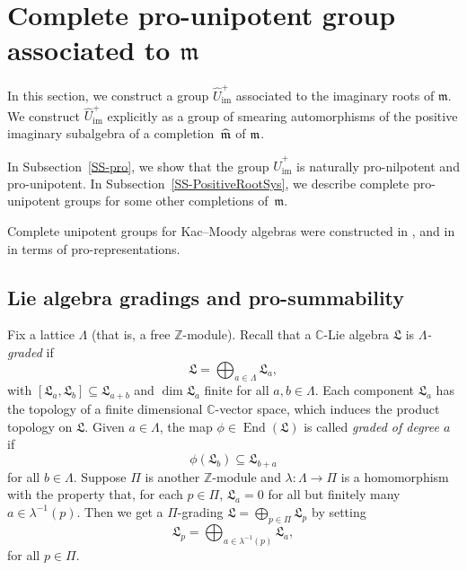 \documentclass[11pt,letterpaper]{amsart}
\numberwithin{thecounter}{section}
\theoremstyle{definition}
\DeclareMathOperator{\Aut}{Aut}
\DeclareMathOperator{\End}{End}
\DeclareMathOperator{\im}{{im}}
\newcommand{\Z}{{\mathbb Z}}
\newcommand{\C}{{\mathbb C}}
\newcommand{\Uhimp}{{\widehat{U}_{\im}^+}}
\begin{document}
\section{Complete pro-unipotent group associated to $\mathfrak m$}\label{S-unip}




In this section, we construct a group $\Uhimp$ associated to the imaginary roots of $\mathfrak m$. We construct  $\Uhimp$ explicitly  as a group of smearing  automorphisms of the positive imaginary subalgebra of a completion~$\widehat{\frak m}$ of $\frak m$. 

In Subsection~\ref{SS-pro}, we show that the group $\Uhimp$ is naturally pro-nilpotent and pro-unipotent.
In Subsection~\ref{SS-PositiveRootSys}, we describe complete pro-unipotent groups for some other completions of~$\mathfrak{m}$.

Complete unipotent groups for  Kac--Moody algebras were constructed in \cite[Section~1.9]{rousseau2012almost}, and in \cite[Section~6.2]{kumar2012kac} in terms of pro-representations.


\subsection{Lie algebra gradings and pro-summability}\label{SS-graded}
Fix a lattice  $\Lambda$ (that is, a free $\Z$-module).
Recall that a $\C$-Lie algebra $\mathfrak{L}$ is \emph{$\Lambda$-graded} if
$$\mathfrak{L} =\bigoplus_{a\in\Lambda} \mathfrak{L}_a,$$
with $\left[\mathfrak{L}_a,\mathfrak{L}_b\right]\subseteq \mathfrak{L}_{a+b}$  and $\dim \mathfrak{L}_a$ finite for all $a,b\in\Lambda$.
Each component $\mathfrak{L}_a$ has the topology of a finite dimensional $\C$-vector space, which induces the product topology on 
$\mathfrak{L}$.
Given $a\in\Lambda$, the map $\phi\in\End(\mathfrak{L})$ is called \emph{graded of degree $a$} if
$$\phi\left(\mathfrak{L}_b \right)\subseteq \mathfrak{L}_{b+a}$$
for all $b\in\Lambda$.
Suppose $\Pi$ is another $\Z$-module  and  $\lambda: \Lambda\to\Pi$ is a homomorphism with the property that, for each $p\in\Pi$, 
$\mathfrak{L}_a=0$ for all but finitely many $a\in \lambda^{-1}(p)$.
Then we get a $\Pi$-grading 
$\mathfrak{L} =\bigoplus_{p\in\Pi} \mathfrak{L}_p$ by setting
$$ \mathfrak{L}_{p} = \bigoplus_{a\in\lambda^{-1}(p)} \mathfrak{L}_a,$$
for all $p\in\Pi$. 
\end{document}
